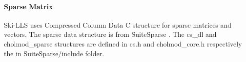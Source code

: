 \documentclass[english,11pt]{article}
\begin{document}
\paragraph{Sparse Matrix}
Ski-LLS uses Compressed Column Data C structure for sparse matrices and vectors. The sparse data structure is from SuiteSparse \cite{10.1145/2049662.2049670}. The cs_dl and cholmod_sparse structures are defined in cs.h and cholmod_core.h respectively the in SuiteSparse/include folder. 















\end{document}

